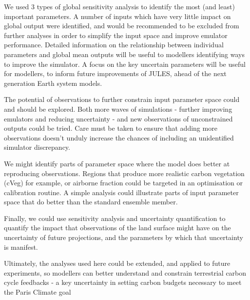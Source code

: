 \documentclass[gmd, manuscript]{copernicus}
\begin{document}
We used 3 types of global sensitivity analysis to identify the most (and least) important parameters.  A number of inputs which have very little impact on global output were identified, and would be recommended to be excluded from further analyses in order to simplify the input space and improve emulator performance. Detailed information on the relationship between individual parameters and global mean outputs will be useful to modellers identifying ways to improve the simulator. A focus on the key uncertain parameters will be useful for modellers, to inform future improvements of JULES, ahead of the next generation Earth system models.

The potential of observations to further constrain input parameter space could and should be explored. Both more waves of simulations - further improving emulators and reducing uncertainty - and new observations of unconstrained outputs could be tried. Care must be taken to ensure that adding more observations doesn't unduly increase the chances of including an unidentified simulator discrepancy.

We might identify parts of parameter space where the model does better at reproducing observations. Regions that produce more realistic carbon vegetation (cVeg) for example, or airborne fraction could be targeted in an optimisation or calibration routine. A simple analysis could illustrate parts of input parameter space that do better than the standard ensemble member.

Finally, we could use sensitivity analysis and uncertainty quantification to quantify the impact that observations of the land surface might have on the uncertainty of future projections, and the parameters by which that uncertainty is manifest.

Ultimately, the analyses used here could be extended, and applied to future experiments, so modellers  can better understand and constrain terrestrial carbon cycle feedbacks - a key uncertainty in setting carbon budgets necessary to meet the Paris Climate goal
    

\end{document}
